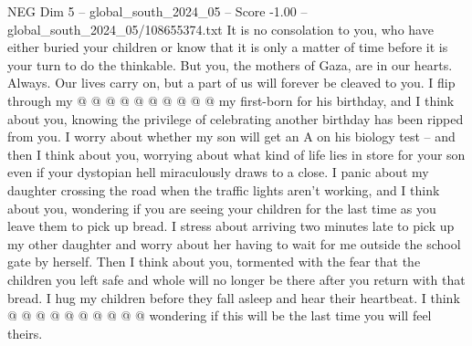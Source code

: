 \begin{textsample}{NEG Dim 5 – global\_south\_2024\_05 – Score -1.00 – global\_south\_2024\_05/108655374.txt}
It is no consolation to you, who have either buried your children or know that it is only a matter of time before it is your turn to do the thinkable.
But you, the mothers of Gaza, are in our hearts.
Always.
Our lives carry on, but a part of us will forever be cleaved to you.
I flip through my @ @ @ @ @ @ @ @ @ @ my first-born for his birthday, and I think about you, knowing the privilege of celebrating another birthday has been ripped from you.
I worry about whether my son will get an A on his biology test -- and then I think about you, worrying about what kind of life lies in store for your son even if your dystopian hell miraculously draws to a close.
I panic about my daughter crossing the road when the traffic lights aren't working, and I think about you, wondering if you are seeing your children for the last time as you leave them to pick up bread.
I stress about arriving two minutes late to pick up my other daughter and worry about her having to wait for me outside the school gate by herself.
Then I think about you, tormented with the fear that the children you left safe and whole will no longer be there after you return with that bread.
I hug my children before they fall asleep and hear their heartbeat.
I think @ @ @ @ @ @ @ @ @ @ wondering if this will be the last time you will feel theirs.

\end{textsample}
